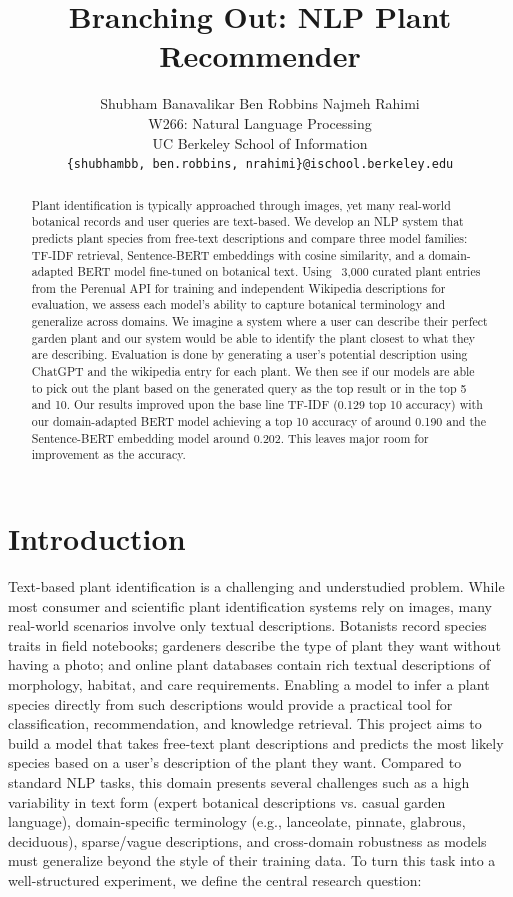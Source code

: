 \documentclass[11pt]{article}
\title{Branching Out: NLP Plant Recommender}
\author{
Shubham Banavalikar \quad Ben Robbins \quad Najmeh Rahimi \\
W266: Natural Language Processing \\
UC Berkeley School of Information \\
\texttt{\{shubhambb, ben.robbins, nrahimi\}@ischool.berkeley.edu}
}
\begin{document}
\maketitle

\hypersetup{
    colorlinks=true,
    urlcolor=blue,
    citecolor=blue,
    linkcolor=blue
}


\begin{abstract}
Plant identification is typically approached through images, yet many real-world botanical records and user queries are text-based. We develop an NLP system that predicts plant species from free-text descriptions and compare three model families: TF-IDF retrieval, Sentence-BERT embeddings with cosine similarity, and a domain-adapted BERT model fine-tuned on botanical text. Using ~3,000 curated plant entries from the Perenual API for training and independent Wikipedia descriptions for evaluation, we assess each model’s ability to capture botanical terminology and generalize across domains. We imagine a system where a user can describe their perfect garden plant and our system would be able to identify the plant closest to what they are describing. Evaluation is done by generating a user's potential description using ChatGPT and the wikipedia entry for each plant. We then see if our models are able to pick out the plant based on the generated query as the top result or in the top 5 and 10. Our results improved upon the base line TF-IDF (0.129 top 10 accuracy) with our domain-adapted BERT model achieving a top 10 accuracy of around 0.190 and the Sentence-BERT embedding model around 0.202. This leaves major room for improvement as the accuracy.
\end{abstract}

\section{Introduction}

Text-based plant identification is a challenging and understudied problem. While most consumer and scientific plant identification systems rely on images, many real-world scenarios involve only textual descriptions. Botanists record species traits in field notebooks; gardeners describe the type of plant they want without having a photo; and online plant databases contain rich textual descriptions of morphology, habitat, and care requirements. Enabling a model to infer a plant species directly from such descriptions would provide a practical tool for classification, recommendation, and knowledge retrieval.
This project aims to build a model that takes free-text plant descriptions and predicts the most likely species based on a user's description of the plant they want. Compared to standard NLP tasks, this domain presents several challenges such as a high variability in text form (expert botanical descriptions vs. casual garden language), domain-specific terminology (e.g., lanceolate, pinnate, glabrous, deciduous), sparse/vague descriptions, and cross-domain robustness as models must generalize beyond the style of their training data. To turn this task into a well-structured experiment, we define the central research question:
\end{document}
